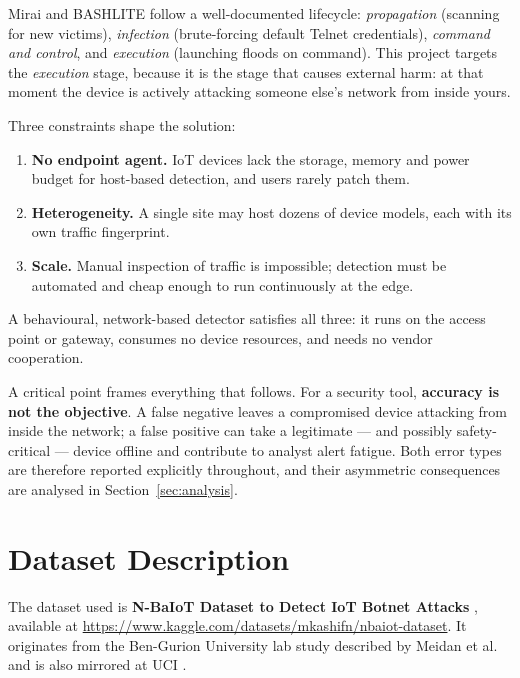 \documentclass[11pt]{article}
\begin{document}
Mirai and BASHLITE follow a well-documented lifecycle: \emph{propagation}
(scanning for new victims), \emph{infection} (brute-forcing default Telnet
credentials), \emph{command and control}, and \emph{execution} (launching
floods on command). This project targets the \emph{execution} stage, because
it is the stage that causes external harm: at that moment the device is
actively attacking someone else's network from inside yours.

Three constraints shape the solution:

\begin{enumerate}[itemsep=2pt]
  \item \textbf{No endpoint agent.} IoT devices lack the storage, memory and
        power budget for host-based detection, and users rarely patch them.
  \item \textbf{Heterogeneity.} A single site may host dozens of device
        models, each with its own traffic fingerprint.
  \item \textbf{Scale.} Manual inspection of traffic is impossible; detection
        must be automated and cheap enough to run continuously at the edge.
\end{enumerate}

A behavioural, network-based detector satisfies all three: it runs on the
access point or gateway, consumes no device resources, and needs no vendor
cooperation.

\medskip
A critical point frames everything that follows. For a security tool,
\textbf{accuracy is not the objective}. A false negative leaves a compromised
device attacking from inside the network; a false positive can take a
legitimate --- and possibly safety-critical --- device offline and contribute
to analyst alert fatigue. Both error types are therefore reported explicitly
throughout, and their asymmetric consequences are analysed in
Section~\ref{sec:analysis}.

\section{Dataset Description}
The dataset used is \textbf{N-BaIoT Dataset to Detect IoT Botnet Attacks}
\cite{kashif2020nbaiot}, available at
\url{https://www.kaggle.com/datasets/mkashifn/nbaiot-dataset}. It originates
from the Ben-Gurion University lab study described by Meidan et al.
\cite{meidan2018nbaiot} and is also mirrored at UCI \cite{uci442}.
\end{document}
